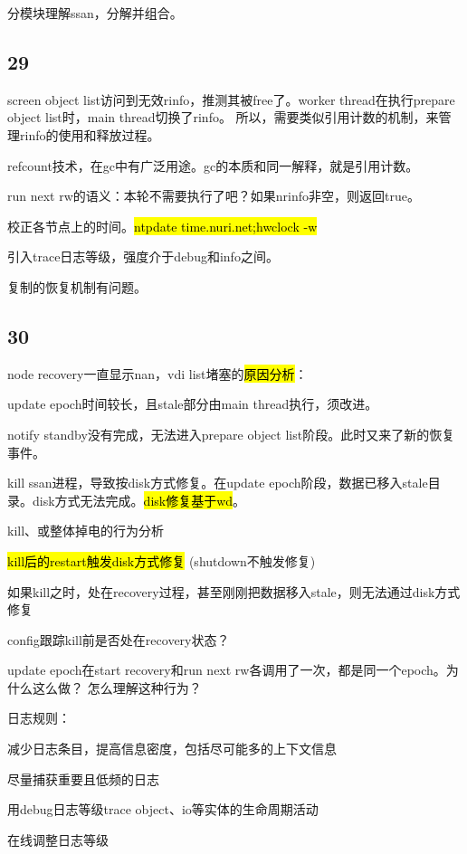 \hrulefill

分模块理解ssan，分解并组合。

\subsection{29}

screen object list访问到无效rinfo，推测其被free了。worker thread在执行prepare object list时，main thread切换了rinfo。
所以，需要类似引用计数的机制，来管理rinfo的使用和释放过程。

refcount技术，在gc中有广泛用途。gc的本质和同一解释，就是引用计数。

run next rw的语义：本轮不需要执行了吧？如果nrinfo非空，则返回true。

校正各节点上的时间。\hl{ntpdate time.nuri.net;hwclock -w}

引入trace日志等级，强度介于debug和info之间。


复制的恢复机制有问题。

\subsection{30}

node recovery一直显示nan，vdi list堵塞的\hl{原因分析}：
\begin{enumbox}
\item update epoch时间较长，且stale部分由main thread执行，须改进。
\item notify standby没有完成，无法进入prepare object list阶段。此时又来了新的恢复事件。
\item kill ssan进程，导致按disk方式修复。在update epoch阶段，数据已移入stale目录。disk方式无法完成。\hl{disk修复基于wd}。
\end{enumbox}

kill、或整体掉电的行为分析
\begin{enumbox}
\item \hl{kill后的restart触发disk方式修复} (shutdown不触发修复)
\item 如果kill之时，处在recovery过程，甚至刚刚把数据移入stale，则无法通过disk方式修复
\item config跟踪kill前是否处在recovery状态？
\end{enumbox}

update epoch在start recovery和run next rw各调用了一次，都是同一个epoch。为什么这么做？
怎么理解这种行为？

日志规则：
\begin{enumbox}
\item 减少日志条目，提高信息密度，包括尽可能多的上下文信息
\item 尽量捕获重要且低频的日志
\item 用debug日志等级trace object、io等实体的生命周期活动
\item 在线调整日志等级
\end{enumbox}
